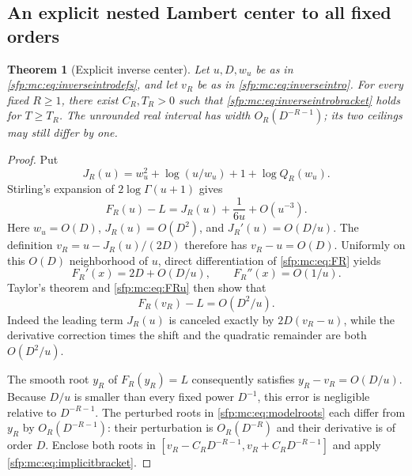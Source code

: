 \documentclass[11pt,letterpaper]{article}
\numberwithin{equation}{section}
\newtheorem{theorem}{Theorem}[section]
\theoremstyle{definition}\newtheorem{definition}[theorem]{Definition}
\theoremstyle{remark}\newtheorem{remark}[theorem]{Remark}
\begin{document}
\subsection{An explicit nested Lambert center to all fixed orders}
\begin{theorem}[Explicit inverse center]\label{sfp:mc:thm:inverse}
Let $u,D,w_u$ be as in \eqref{sfp:mc:eq:inverseintrodefs}, and let
$v_R$ be as in \eqref{sfp:mc:eq:inverseintro}. For every fixed $R\geq1$,
there exist $C_R,T_R>0$ such that
\eqref{sfp:mc:eq:inverseintrobracket} holds for $T\geq T_R$.
The unrounded real interval has width $O_R(D^{-R-1})$;
its two ceilings may still differ by one.
\end{theorem}
\begin{proof}
Put
\begin{equation}\label{sfp:mc:eq:inverseB}
 J_R(u)=w_u^2+\log(u/w_u)+1+\log Q_R(w_u).
\end{equation}
Stirling's expansion of $2\log\Gamma(u+1)$ gives
\begin{equation}\label{sfp:mc:eq:FRu}
 F_R(u)-L=J_R(u)+\frac1{6u}+O(u^{-3}).
\end{equation}
Here $w_u=O(D)$, $J_R(u)=O(D^2)$, and
$J_R'(u)=O(D/u)$. The definition $v_R=u-J_R(u)/(2D)$
therefore has $v_R-u=O(D)$.
Uniformly on this $O(D)$ neighborhood of $u$, direct
 differentiation of \eqref{sfp:mc:eq:FR} yields
\[
 F_R'(x)=2D+O(D/u),\qquad F_R''(x)=O(1/u).
\]
Taylor's theorem and \eqref{sfp:mc:eq:FRu} then show that
\begin{equation}\label{sfp:mc:eq:FRv}
 F_R(v_R)-L=O(D^2/u).
\end{equation}
Indeed the leading term $J_R(u)$ is canceled exactly by
$2D(v_R-u)$, while the derivative correction times the shift
and the quadratic remainder are both $O(D^2/u)$.

The smooth root $y_R$ of $F_R(y_R)=L$ consequently satisfies
$y_R-v_R=O(D/u)$. Because $D/u$ is smaller than every fixed
power $D^{-1}$, this error is negligible relative to
$D^{-R-1}$. The perturbed roots in \eqref{sfp:mc:eq:modelroots} each
differ from $y_R$ by $O_R(D^{-R-1})$: their perturbation is
$O_R(D^{-R})$ and their derivative is of order $D$.
Enclose both roots in
$[v_R-C_RD^{-R-1},v_R+C_RD^{-R-1}]$ and apply
\eqref{sfp:mc:eq:implicitbracket}.
\end{proof}
\end{document}
